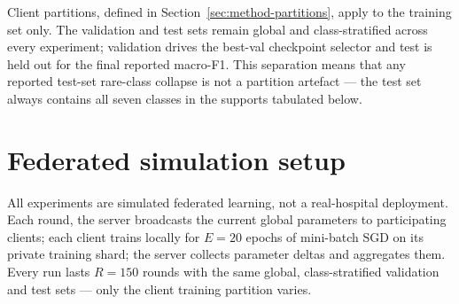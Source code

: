 \documentclass[11pt,a4paper]{report}
\begin{document}
Client partitions, defined in Section~\ref{sec:method-partitions}, apply
to the training set only. The validation and test sets remain global and
class-stratified across every experiment; validation drives the best-val
checkpoint selector and test is held out for the final reported macro-F1.
This separation means that any reported test-set rare-class collapse is
not a partition artefact --- the test set always contains all seven
classes in the supports tabulated below.

\begin{table}[H]
\centering
\small
\caption{DermaMNIST class supports and roles in this thesis. Train
prevalence and test support are computed directly from the MedMNIST~v2
release; the train support totals $7007$ and the test support totals
$2005$. The rare-class group $\mathrm{RARE\_IDX} = \{\text{dermato},
\text{melanoma}, \text{vascular}\}$ defines the rare-class F1 used
throughout Chapter~\ref{ch:results}.}
\label{tab:dataset-classes}
\end{table}

\section{Federated simulation setup}
\label{sec:method-simulation}

All experiments are simulated federated learning, not a real-hospital
deployment. Each round, the server broadcasts the current global
parameters to participating clients; each client trains locally for
$E = 20$ epochs of mini-batch SGD on its private training shard; the
server collects parameter deltas and aggregates them. Every run lasts
$R = 150$ rounds with the same global, class-stratified validation
and test sets --- only the client training partition varies.
\end{document}
